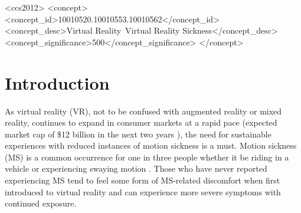 \documentclass[sigconf]{acmart}
\begin{document}
\begin{CCSXML}
<ccs2012>
 <concept>
  <concept_id>10010520.10010553.10010562</concept_id>
  <concept_desc>Virtual Reality~Virtual Reality Sickness</concept_desc>
  <concept_significance>500</concept_significance>
 </concept>
\end{CCSXML}





\maketitle

\section{Introduction}
As virtual reality (VR), not to be confused with augmented reality or mixed reality\cite{rauschnabel22}, continues to expand in consumer markets at a rapid pace (expected market cap of \$12 billion in the next two years \cite{Lee21}), the need for sustainable experiences with reduced instances of motion sickness is a must. Motion sickness (MS) is a common occurrence for one in three people whether it be riding in a vehicle or experiencing swaying motion \cite{motion}. Those who have never reported experiencing MS tend to feel some form of MS-related discomfort when first introduced to virtual reality and can experience more severe symptoms with continued exposure. 
\end{document}
